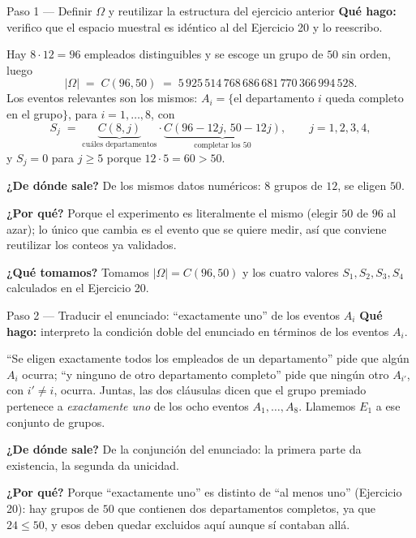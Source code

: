 \documentclass[11pt]{article}
\begin{document}
\begin{sol}

\begin{paso}{Paso 1 --- Definir $\Omega$ y reutilizar la estructura del ejercicio anterior}
\textbf{Qu\'e hago:} verifico que el espacio muestral es id\'entico al del Ejercicio 20 y lo reescribo.

Hay $8\cdot 12=96$ empleados distinguibles y se escoge un grupo de $50$ sin orden, luego
\[
|\Omega| \;=\; C(96,50) \;=\; 5\,925\,514\,768\,686\,681\,770\,366\,994\,528 .
\]
Los eventos relevantes son los mismos: $A_i=\{$el departamento $i$ queda completo en el grupo$\}$, para $i=1,\dots,8$, con
\[
S_j \;=\; \underbrace{C(8,j)}_{\text{cu\'ales departamentos}}\cdot\underbrace{C(96-12j,\,50-12j)}_{\text{completar los 50}},\qquad j=1,2,3,4,
\]
y $S_j=0$ para $j\ge 5$ porque $12\cdot 5=60>50$.

\textbf{¿De d\'onde sale?} De los mismos datos num\'ericos: $8$ grupos de $12$, se eligen $50$.

\textbf{¿Por qu\'e?} Porque el experimento es literalmente el mismo (elegir $50$ de $96$ al azar); lo \'unico que cambia es el evento que se quiere medir, as\'i que conviene reutilizar los conteos ya validados.

\textbf{¿Qu\'e tomamos?} Tomamos $|\Omega|=C(96,50)$ y los cuatro valores $S_1,S_2,S_3,S_4$ calculados en el Ejercicio 20.
\end{paso}

\begin{paso}{Paso 2 --- Traducir el enunciado: ``exactamente uno'' de los eventos $A_i$}
\textbf{Qu\'e hago:} interpreto la condici\'on doble del enunciado en t\'erminos de los eventos $A_i$.

``Se eligen exactamente todos los empleados de un departamento'' pide que alg\'un $A_i$ ocurra; ``y ninguno de otro departamento completo'' pide que ning\'un otro $A_{i'}$, con $i'\ne i$, ocurra. Juntas, las dos cl\'ausulas dicen que el grupo premiado pertenece a \emph{exactamente uno} de los ocho eventos $A_1,\dots,A_8$. Llamemos $E_1$ a ese conjunto de grupos.

\textbf{¿De d\'onde sale?} De la conjunci\'on del enunciado: la primera parte da existencia, la segunda da unicidad.

\textbf{¿Por qu\'e?} Porque ``exactamente uno'' es distinto de ``al menos uno'' (Ejercicio 20): hay grupos de $50$ que contienen dos departamentos completos, ya que $24\le 50$, y esos deben quedar excluidos aqu\'i aunque s\'i contaban all\'a.


\end{paso}
\end{sol}
\end{document}
